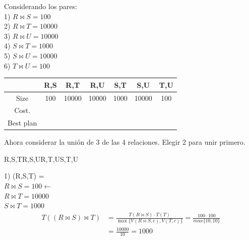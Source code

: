 \documentclass{templateNote}
\begin{document}
\begin{enumerate}
\begin{enumerate}[label=\alph*)]
                Considerando los pares: \\

                1) $R \Join S = 100$ \\
                2) $R \Join T = 10000$ \\
                3) $R \Join U = 10000$ \\
                4) $S \Join T = 1000$ \\
                5) $S \Join U = 10000$ \\
                6) $T \Join U = 100$ \\

                \begin{center}
                    \begin{tabular}{|c|c|c|c|c|c|c|}
                        \hline
                        & R,S & R,T & R,U & S,T & S,U & T,U\\
                        \hline
                        Size & 100 & 10000 & 10000 & 1000 & 10000 & 100 \\
                        \hline
                        Cost. & & & & & &  \\
                        \hline
                        Best plan & & & & & &  \\
                        \hline
                    \end{tabular}
                \end{center}
                
                \noindent Ahora considerar la unión de 3 de las 4 relaciones. Elegir 2 para unir primero.\\
                \begin{center}
                    {R,S,T}{R,S,U}{R,T,U}{S,T,U}
                \end{center}

                1) (R,S,T) = \\
                \hspace*{0.25cm}$R \Join S = 100  \leftarrow$ \\
                \hspace*{0.25cm}$R \Join T = 10000$ \\
                \hspace*{0.25cm}$S \Join T = 1000$ 
                \begin{align*}
                    T((R \Join S) \Join T) &= \frac{T(R \Join S)\cdot T(T)}{\max\{V(R \Join S,c),V(T,c)\}} = \frac{100\cdot100}{max\{10,10\}} \\ 
                    &= \frac{10000}{10} = 1000 
                \end{align*}
                

\end{enumerate}
\end{enumerate}
\end{document}
